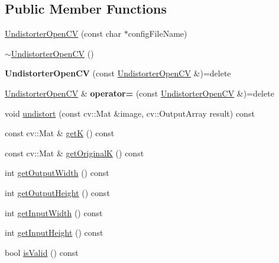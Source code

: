 \subsection*{Public Member Functions}
\begin{DoxyCompactItemize}
\item 
\hyperlink{classlsd__slam_1_1_undistorter_open_c_v_afb1fc6fe47e68f31cb7ae7d696b72e4d}{Undistorter\-Open\-C\-V} (const char $\ast$config\-File\-Name)
\item 
\hyperlink{classlsd__slam_1_1_undistorter_open_c_v_a95f7331ff5c0cdd09f52a673884998df}{$\sim$\-Undistorter\-Open\-C\-V} ()
\item 
\hypertarget{classlsd__slam_1_1_undistorter_open_c_v_aedd049060155bbaab049a00c99716daa}{{\bfseries Undistorter\-Open\-C\-V} (const \hyperlink{classlsd__slam_1_1_undistorter_open_c_v}{Undistorter\-Open\-C\-V} \&)=delete}\label{classlsd__slam_1_1_undistorter_open_c_v_aedd049060155bbaab049a00c99716daa}

\item 
\hypertarget{classlsd__slam_1_1_undistorter_open_c_v_a459d3ea80c285f33a8fa236c3a7e0f32}{\hyperlink{classlsd__slam_1_1_undistorter_open_c_v}{Undistorter\-Open\-C\-V} \& {\bfseries operator=} (const \hyperlink{classlsd__slam_1_1_undistorter_open_c_v}{Undistorter\-Open\-C\-V} \&)=delete}\label{classlsd__slam_1_1_undistorter_open_c_v_a459d3ea80c285f33a8fa236c3a7e0f32}

\item 
void \hyperlink{classlsd__slam_1_1_undistorter_open_c_v_ae788f7b44d7f5760a88bcfc24fe880b4}{undistort} (const cv\-::\-Mat \&image, cv\-::\-Output\-Array result) const 
\item 
const cv\-::\-Mat \& \hyperlink{classlsd__slam_1_1_undistorter_open_c_v_a5fde19e93231ad65dbf6c98ad009c605}{get\-K} () const 
\item 
const cv\-::\-Mat \& \hyperlink{classlsd__slam_1_1_undistorter_open_c_v_ab1b18629303917c0930a41b7954a49fc}{get\-Original\-K} () const 
\item 
int \hyperlink{classlsd__slam_1_1_undistorter_open_c_v_aec393d5322851339ff60b0fac92ca183}{get\-Output\-Width} () const 
\item 
int \hyperlink{classlsd__slam_1_1_undistorter_open_c_v_ab6e455eb76f688d03c9159effd3ef6e2}{get\-Output\-Height} () const 
\item 
int \hyperlink{classlsd__slam_1_1_undistorter_open_c_v_a54404844c492185ae02bead84413297c}{get\-Input\-Width} () const 
\item 
int \hyperlink{classlsd__slam_1_1_undistorter_open_c_v_a0945bdec1a94a7685824cfccc583836d}{get\-Input\-Height} () const 
\item 
bool \hyperlink{classlsd__slam_1_1_undistorter_open_c_v_a16603612fa9dce55c0715a19d14df0d8}{is\-Valid} () const 
\end{DoxyCompactItemize}
